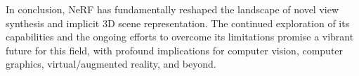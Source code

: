 In conclusion, NeRF has fundamentally reshaped the landscape of novel view synthesis and implicit 3D scene representation. The continued exploration of its capabilities and the ongoing efforts to overcome its limitations promise a vibrant future for this field, with profound implications for computer vision, computer graphics, virtual/augmented reality, and beyond.

